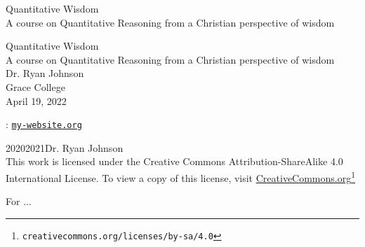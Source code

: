 \documentclass[twoside,10pt,]{book}
\newcommand{\titlepagefont}{\relax}
\newcommand{\mono}[1]{\texttt{#1}}
\numberwithin{equation}{chapter}
\begin{document}
\raggedbottom
\frontmatter
\thispagestyle{empty}
{\titlepagefont\centering
\vspace*{0.28\textheight}
{\Huge Quantitative Wisdom}\\[2\baselineskip]
{\LARGE A course on Quantitative Reasoning from a Christian perspective of wisdom}\\
}
\clearpage
\thispagestyle{empty}
\null%
\clearpage
\thispagestyle{empty}
{\titlepagefont\centering
\vspace*{0.14\textheight}
{\Huge Quantitative Wisdom}\\[\baselineskip]
{\LARGE A course on Quantitative Reasoning from a Christian perspective of wisdom}\\[3\baselineskip]
{\Large Dr. Ryan Johnson}\\[0.5\baselineskip]
{\Large Grace College}\\[3\baselineskip]
{\Large April 19, 2022}\\}
\clearpage
\thispagestyle{empty}
\hypertarget{g:colophon:idp1848420472}{}
: \href{http:\slash{}\slash{}my.website.org}{\mono{my-website.org}}\par\medskip
\noindent\textcopyright{}2020\textendash{}2021\quad{}Dr. Ryan Johnson\\[0.5\baselineskip]
 This work is licensed under the Creative Commons Attribution-ShareAlike 4.0 International License. To view a copy of this license, visit \href{http://creativecommons.org/licenses/by-sa/4.0/}{CreativeCommons.org}\footnote{\nolinkurl{creativecommons.org/licenses/by-sa/4.0}\label{g:fn:idp1848432376}}\par\medskip
{}
\null\clearpage
\cleardoublepage
\thispagestyle{empty}
\begin{center}\Large%
For ...%
\end{center}
\clearpage
\end{document}
